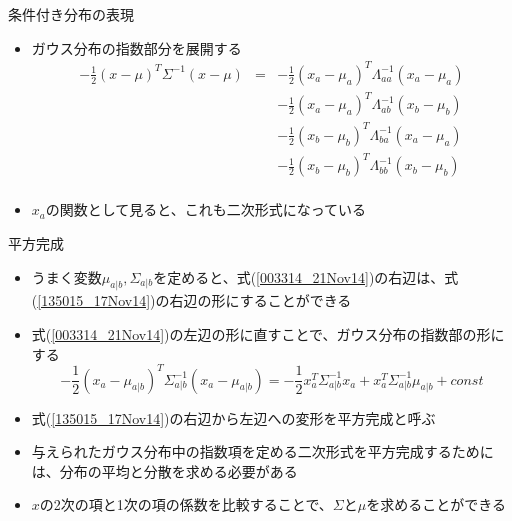 \begin{frame}{条件付き分布の表現}
 \begin{itemize}
  \item ガウス分布の指数部分を展開する
        \begin{eqnarray}
         -\frac{1}{2}(x - \mu)^{T}\Sigma^{-1}(x-\mu) &= &
          -\frac{1}{2}(x_a - \mu_a)^{T}\Lambda_{aa}^{-1}(x_a-\mu_a) \nonumber \\
         &&-\frac{1}{2}(x_a - \mu_a)^{T}\Lambda_{ab}^{-1}(x_b-\mu_b) \nonumber \\
         &&-\frac{1}{2}(x_b - \mu_b)^{T}\Lambda_{ba}^{-1}(x_a-\mu_a) \nonumber \\
         &&-\frac{1}{2}(x_b - \mu_b)^{T}\Lambda_{bb}^{-1}(x_b-\mu_b) \nonumber \\
         &&\label{003314_21Nov14}
        \end{eqnarray}
  \item $x_a$の関数として見ると、これも\alert{二次形式}になっている
 \end{itemize}
\end{frame}

\begin{frame}{平方完成}
 \begin{itemize}
		\item うまく変数$\mu_{a|b},\Sigma_{a|b}$を定めると、式(\ref{003314_21Nov14})の右辺は、式(\ref{135015_17Nov14})の右辺の形にすることができる
	\item 式(\ref{003314_21Nov14})の左辺の形に直すことで、ガウス分布の指数部の形にする
        \begin{equation}
         -\frac{1}{2}(x_a-\mu_{a|b})^{T}\Sigma_{a|b}^{-1}(x_a-\mu_{a|b}) = -\frac{1}{2}x_a^T\Sigma_{a|b}^{-1}x_a+x_a^T\Sigma_{a|b}^{-1}\mu_{a|b} + const\label{135015_17Nov14}
        \end{equation}
  \item 式(\ref{135015_17Nov14})の右辺から左辺への変形を\alert{平方完成}と呼ぶ

  \item 与えられたガウス分布中の指数項を定める二次形式を平方完成するためには、分布の平均と分散を求める必要がある
  \item $x$の2次の項と1次の項の係数を比較することで、$\Sigma$と$\mu$を求めることができる
 \end{itemize}
\end{frame}

